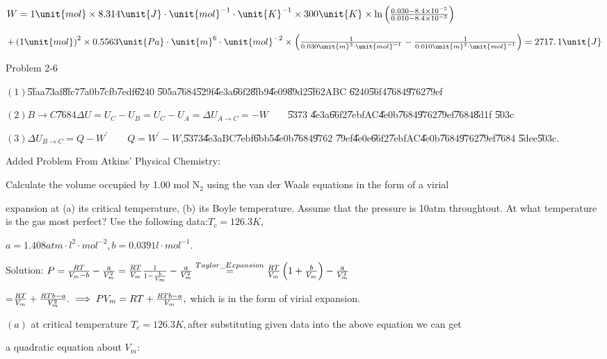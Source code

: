 \documentclass{article}
\begin{document}
$W=1\unit{mol}\times 8.314\unit{J}\cdot \unit{mol}^{-1}\cdot \unit{K}%
^{-1}\times 300\unit{K}\times \ln \left( \frac{0.030-8.4\times 10^{-5}}{%
0.010-8.4\times 10^{-5}}\right) $

$+\left( 1\unit{mol}\right) ^{2}\times 0.5563\unit{Pa}\cdot \unit{m}%
^{6}\cdot \unit{mol}^{-2}\times \left( \frac{1}{0.030\unit{m}^{3}\cdot \unit{%
mol}^{-1}}-\frac{1}{0.010\unit{m}^{3}\cdot \unit{mol}^{-1}}\right)
=\allowbreak 2717.\,\allowbreak 1\unit{J}$

Problem 2-6

$\left( 1\right) $\U{5faa}\U{73af}\U{8fc7}\U{7a0b}\U{7cfb}\U{7edf}\U{6240}%
\U{505a}\U{7684}\U{529f}\U{4e3a}\U{66f2}\U{8fb9}\U{4e09}\U{89d2}\U{5f62}ABC%
\U{6240}\U{56f4}\U{7684}\U{9762}\U{79ef}

$\left( 2\right) B\rightarrow C$\U{7684}$\Delta
U=U_{C}-U_{B}=U_{C}-U_{A}=\Delta U_{A\rightarrow C}=-W\qquad $\U{5373}%
\U{4e3a}\U{66f2}\U{7ebf}AC\U{4e0b}\U{7684}\U{9762}\U{79ef}\U{7684}\U{8d1f}%
\U{503c}

$\left( 3\right) \Delta U_{B\rightarrow C}=Q-W^{\prime }\qquad Q=W^{\prime
}-W$,\qquad \U{5373}\U{4e3a}BC\U{7ebf}\U{6bb5}\U{4e0b}\U{7684}\U{9762}%
\U{79ef}\U{4e0e}\U{66f2}\U{7ebf}AC\U{4e0b}\U{7684}\U{9762}\U{79ef}\U{7684}%
\U{5dee}\U{503c}.

Added Problem From Atkins' Physical Chemistry:

Calculate the volume occupied by 1.00 mol N$_{2}$ using the van der Waals
equations in the form of a virial

expansion at (a) its critical temperature, (b) its Boyle temperature. Assume
that the pressure is 10atm throughtout. At what temperature is the gas most
perfect? Use the following data:$T_{c}=126.3\unit{K},$

$a=1.408\unit{atm}\cdot \unit{l}^{2}\cdot \unit{mol}^{-2},b=0.0391\unit{l}%
\cdot \unit{mol}^{-1}.$

Solution: $P=\frac{RT}{V_{m}-b}-\frac{a}{V_{m}^{2}}=\frac{RT}{V_{m}}\frac{1}{%
1-\frac{b}{V_{m}}}-\frac{a}{V_{m}^{2}}\overset{Taylor\_Expansion}{=}\frac{RT%
}{V_{m}}\left( 1+\frac{b}{V_{m}}\right) -\frac{a}{V_{m}^{2}}$

=$\frac{RT}{V_{m}}+\frac{RTb-a}{V_{m}^{2}}.\implies PV_{m}=RT+\frac{RTb-a}{%
V_{m}},$ which is in the form of virial expansion.

$\left( a\right) $ at critical temperature $T_{c}=126.3\unit{K},$after
substituting given data into the above equation we can get

a quadratic equation about $V_{m}:$
\end{document}
